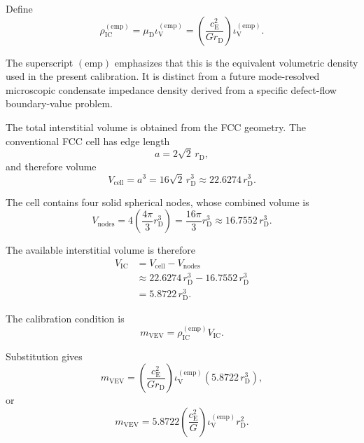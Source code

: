 Define
\begin{equation}
    \boxed{
    \rho_{\mathrm{IC}}^{(\mathrm{emp})}
    =
    \mu_{\mathrm D}
    \iota_{\mathrm V}^{(\mathrm{emp})}
    =
    \left(
        \frac{
            c_{\mathrm E}^{2}
        }{
            Gr_{\mathrm D}
        }
    \right)
    \iota_{\mathrm V}^{(\mathrm{emp})}.
    }
\end{equation}

The superscript $(\mathrm{emp})$ emphasizes that this is the equivalent
volumetric density used in the present calibration. It is distinct from a
future mode-resolved microscopic condensate impedance density derived from a
specific defect-flow boundary-value problem.

The total interstitial volume is obtained from the FCC geometry. The
conventional FCC cell has edge length
\begin{equation}
    a
    =
    2\sqrt{2}\,r_{\mathrm D},
\end{equation}
and therefore volume
\begin{equation}
    V_{\mathrm{cell}}
    =
    a^3
    =
    16\sqrt{2}\,r_{\mathrm D}^{3}
    \approx
    22.6274\,r_{\mathrm D}^{3}.
\end{equation}

The cell contains four solid spherical nodes, whose combined volume is
\begin{equation}
    V_{\mathrm{nodes}}
    =
    4
    \left(
        \frac{4\pi}{3}r_{\mathrm D}^{3}
    \right)
    =
    \frac{16\pi}{3}
    r_{\mathrm D}^{3}
    \approx
    16.7552\,r_{\mathrm D}^{3}.
\end{equation}

The available interstitial volume is therefore
\begin{align}
    V_{\mathrm{IC}}
    &=
    V_{\mathrm{cell}}
    -
    V_{\mathrm{nodes}}
    \\
    &\approx
    22.6274\,r_{\mathrm D}^{3}
    -
    16.7552\,r_{\mathrm D}^{3}
    \\
    &=
    5.8722\,r_{\mathrm D}^{3}.
\end{align}

The calibration condition is
\begin{equation}
    \boxed{
    m_{\mathrm{VEV}}
    =
    \rho_{\mathrm{IC}}^{(\mathrm{emp})}
    V_{\mathrm{IC}}.
    }
\end{equation}

Substitution gives
\begin{equation}
    m_{\mathrm{VEV}}
    =
    \left(
        \frac{
            c_{\mathrm E}^{2}
        }{
            Gr_{\mathrm D}
        }
    \right)
    \iota_{\mathrm V}^{(\mathrm{emp})}
    \left(
        5.8722\,r_{\mathrm D}^{3}
    \right),
\end{equation}
or
\begin{equation}
    m_{\mathrm{VEV}}
    =
    5.8722
    \left(
        \frac{
            c_{\mathrm E}^{2}
        }{
            G
        }
    \right)
    \iota_{\mathrm V}^{(\mathrm{emp})}
    r_{\mathrm D}^{2}.
\end{equation}

